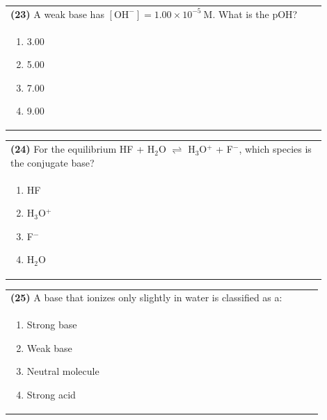 \documentclass{article}
\begin{document}
\noindent\begin{tabular}{|p{0.9\linewidth}|}
\hline
\textbf{(23)} A weak base has $[\text{OH}^-] = 1.00\times10^{-5}\ \text{M}$. What is the pOH? \\[0.2cm]
\begin{minipage}{0.85\linewidth}
\begin{enumerate}[label=\alph*.]
\item 3.00 \item 5.00 \item 7.00 \item 9.00
\end{enumerate}
\end{minipage}\\[0.2cm]
\hline
\end{tabular}

\noindent\begin{tabular}{|p{0.9\linewidth}|}
\hline
\textbf{(24)} For the equilibrium HF + H$_2$O $\rightleftharpoons$ H$_3$O$^+$ + F$^-$, which species is the conjugate base? \\[0.2cm]
\begin{minipage}{0.85\linewidth}
\begin{enumerate}[label=\alph*.]
\item HF \item H$_3$O$^+$ \item F$^-$ \item H$_2$O
\end{enumerate}
\end{minipage}\\[0.2cm]
\hline
\end{tabular}
\newpage

\noindent\begin{tabular}{|p{0.9\linewidth}|}
\hline
\textbf{(25)} A base that ionizes only slightly in water is classified as a: \\[0.2cm]
\begin{minipage}{0.85\linewidth}
\begin{enumerate}[label=\alph*.]
\item Strong base \item Weak base \item Neutral molecule \item Strong acid
\end{enumerate}
\end{minipage}\\[0.2cm]
\hline
\end{tabular}
\end{document}
